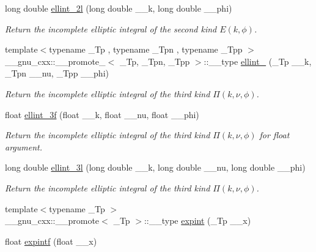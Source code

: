 \begin{DoxyCompactItemize}
long double \hyperlink{group__tr29124__math__spec__func_ga5c791332d374a809d8ca16c69a1a30f5}{ellint\+\_\+2l} (long double \+\_\+\+\_\+k, long double \+\_\+\+\_\+phi)
\begin{DoxyCompactList}\small\item\em Return the incomplete elliptic integral of the second kind $ E(k,\phi) $. \end{DoxyCompactList}\item 
{\footnotesize template$<$typename \+\_\+\+Tp , typename \+\_\+\+Tpn , typename \+\_\+\+Tpp $>$ }\\\+\_\+\+\_\+gnu\+\_\+cxx\+::\+\_\+\+\_\+promote\+\_$<$ \+\_\+\+Tp, \+\_\+\+Tpn, \+\_\+\+Tpp $>$\+::\+\_\+\+\_\+type \hyperlink{group__tr29124__math__spec__func_ga20832e3a67d25cc3d415cafc88019ac3}{ellint\+\_} (\+\_\+\+Tp \+\_\+\+\_\+k, \+\_\+\+Tpn \+\_\+\+\_\+nu, \+\_\+\+Tpp \+\_\+\+\_\+phi)
\begin{DoxyCompactList}\small\item\em Return the incomplete elliptic integral of the third kind $ \Pi(k,\nu,\phi) $. \end{DoxyCompactList}\item 
float \hyperlink{group__tr29124__math__spec__func_ga1a80bd2c15bc9fbecda2630a9e9409e7}{ellint\+\_\+3f} (float \+\_\+\+\_\+k, float \+\_\+\+\_\+nu, float \+\_\+\+\_\+phi)
\begin{DoxyCompactList}\small\item\em Return the incomplete elliptic integral of the third kind $ \Pi(k,\nu,\phi) $ for {\ttfamily float} argument. \end{DoxyCompactList}\item 
long double \hyperlink{group__tr29124__math__spec__func_gaa8c0e5864df8769021a7f3e21a30c5d2}{ellint\+\_\+3l} (long double \+\_\+\+\_\+k, long double \+\_\+\+\_\+nu, long double \+\_\+\+\_\+phi)
\begin{DoxyCompactList}\small\item\em Return the incomplete elliptic integral of the third kind $ \Pi(k,\nu,\phi) $. \end{DoxyCompactList}\item 
{\footnotesize template$<$typename \+\_\+\+Tp $>$ }\\\+\_\+\+\_\+gnu\+\_\+cxx\+::\+\_\+\+\_\+promote$<$ \+\_\+\+Tp $>$\+::\+\_\+\+\_\+type \hyperlink{group__tr29124__math__spec__func_ga88ba17f5d050a6973ca4db1bf6e90590}{expint} (\+\_\+\+Tp \+\_\+\+\_\+x)
\item 
float \hyperlink{group__tr29124__math__spec__func_ga5842816f6eed2594e0a327df4e4a2a47}{expintf} (float \+\_\+\+\_\+x)

\end{DoxyCompactItemize}
